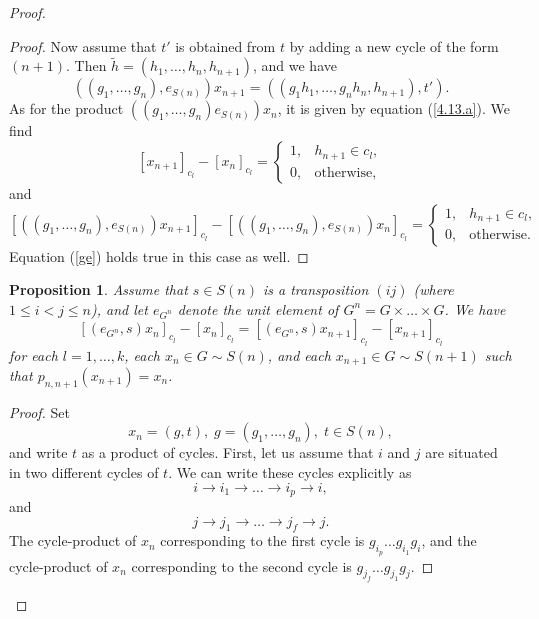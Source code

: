 \documentclass[12pt]{amsart}
\newtheorem{prop}[thm]{Proposition}
\theoremstyle{definition}
\numberwithin{equation}{section}
\begin{document}
\begin{proof}
\begin{proof}
Now assume that $t'$  is obtained from $t$ by adding a new cycle of the form $(n+1)$. Then
$\tilde{h}=\left(h_1,\ldots,h_n,h_{n+1}\right)$, and we have
$$
\left(\left(g_1,\ldots,g_n\right),e_{S(n)}\right)x_{n+1}
=\left(\left(g_1h_1,\ldots,g_nh_n,h_{n+1}\right),t'\right).
$$
As for the product $\left(\left(g_1,\ldots,g_n\right)e_{S(n)}\right)x_n$, it is given by equation (\ref{4.13.a}).
We find
$$
\left[x_{n+1}\right]_{c_l}-\left[x_n\right]_{c_l}=
 \left\{
 \begin{array}{ll}
 1, & h_{n+1}\in c_l, \\
 0, & \mbox{otherwise},
\end{array}
\right.
$$
and
$$
\left[\left(\left(g_1,\ldots,g_n\right),e_{S(n)}\right)x_{n+1}\right]_{c_l}
-\left[\left(\left(g_1,\ldots,g_n\right),e_{S(n)}\right)x_n\right]_{c_l}=
 \left\{
 \begin{array}{ll}
 1, & h_{n+1}\in c_l, \\
 0, & \mbox{otherwise}.
\end{array}
\right.
$$
Equation (\ref{ge}) holds true in this case as well.
\end{proof}
\begin{prop}\label{PROPOSITIONCoW2} Assume that $s\in S(n)$ is a transposition $(ij)$ (where $1\leq i<j\leq n$), and let $e_{G^{n}}$ denote the unit element of $G^n=G\times\ldots\times G$. We have
\begin{equation}\label{3.3.13}
\left[\left(e_{G^n},s\right)x_n\right]_{c_l}-\left[x_n\right]_{c_l}
=\left[\left(e_{G^n},s\right)x_{n+1}\right]_{c_l}-\left[x_{n+1}\right]_{c_l}
\end{equation}
for each $l=1,\ldots,k$, each $x_n\in G\sim S(n)$, and each $x_{n+1}\in G\sim S(n+1)$ such that $p_{n,n+1}\left(x_{n+1}\right)=x_n$.
\end{prop}
\begin{proof}Set
$$
x_n=\left(g,t\right),\; g=\left(g_1,\ldots,g_n\right),\; t\in S(n),
$$
and write $t$ as a product of cycles. First, let us assume that $i$ and $j$ are situated in two different cycles of $t$.
We can write these cycles explicitly as
\begin{equation}\label{3.3.14}
i\rightarrow i_1\rightarrow\ldots\rightarrow i_p\rightarrow i,
\end{equation}
and
\begin{equation}\label{3.3.15}
j\rightarrow j_1\rightarrow\ldots\rightarrow j_f\rightarrow j.
\end{equation}
The cycle-product of $x_n$ corresponding to the first cycle is $g_{i_p}\ldots g_{i_1}g_i$, and the cycle-product of $x_n$ corresponding to the second cycle is $g_{j_f}\ldots g_{j_1}g_{j}$.


\end{proof}
\end{proof}
\end{document}
